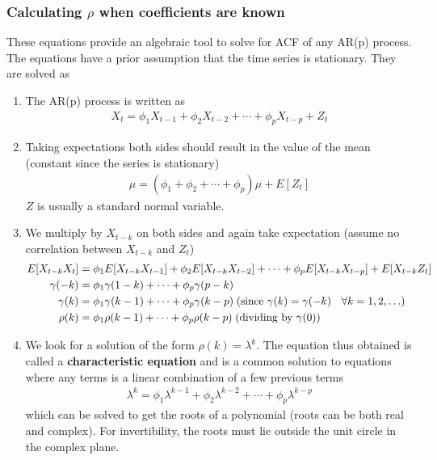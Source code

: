 \documentclass[../../time_series_notes.tex]{subfiles}
\begin{document}
\subsubsection*{Calculating $\rho$ when coefficients are known}
These equations provide an algebraic tool to solve for ACF of any AR(p) process. The equations have a prior assumption that the time series is stationary. They are solved as
\begin{enumerate}
    \item The AR(p) process is written as
    \begin{align*}
        X_{t} = \phi_{1}X_{t-1} + \phi_{2}X_{t-2} + \cdots + \phi_{p}X_{t-p} + Z_{t}
    \end{align*}
    \item Taking expectations both sides should result in the value of the mean (constant since the series is stationary)
    \begin{align*}
        \mu = (\phi_{1} + \phi_{2} + \cdots + \phi_{p})\mu + E[Z_{t}]
    \end{align*}
    $Z$ is usually a standard normal variable.
    \item We multiply by $X_{t-k}$ on both sides and again take expectation (assume no correlation between $X_{t-k}$ and $Z_{t}$)
    \begin{align*}
        E[X_{t-k}X_{t}] &= \phi_{1}E[X_{t-k}X_{t-1}] + \phi_{2}E[X_{t-k}X_{t-2}] + \cdots + \phi_{p}E[X_{t-k}X_{t-p}] + E[X_{t-k}Z_{t}]\\
        \gamma(-k) &= \phi_{1}\gamma(1-k) + \cdots + \phi_{p}\gamma(p-k)\\
        \gamma(k) &= \phi_{1}\gamma(k-1) + \cdots + \phi_{p}\gamma(k-p) \; (\text{since $\gamma(k) = \gamma(-k)$ \; $\forall k=1,2,\ldots$})\\
        \rho(k) &= \phi_{1}\rho(k-1) + \cdots + \phi_{p}\rho(k-p) \; (\text{dividing by $\gamma(0)$})
    \end{align*}
    \item We look for a solution of the form $\rho(k) = \lambda^{k}$. The equation thus obtained is called a \textbf{characteristic equation} and is a common solution to equations where any terms is a linear combination of a few previous terms
    \begin{align*}
        \lambda^{k} = \phi_{1}\lambda^{k-1} + \phi_{2}\lambda^{k-2} + \cdots + \phi_{p}\lambda^{k-p}
    \end{align*}
    which can be solved to get the roots of a polynomial (roots can be both real and complex). For invertibility, the roots must lie outside the unit circle in the complex plane.

\end{enumerate}
\end{document}
